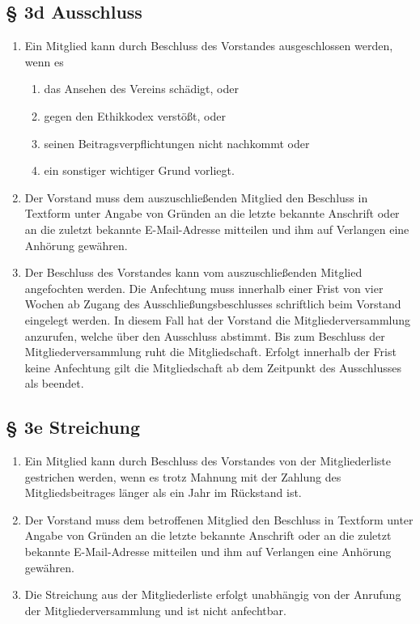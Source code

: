 \documentclass[11pt,a4paper]{scrartcl}
\begin{document}
\subsection*{§ 3d Ausschluss}
\begin{enumerate}[label=\arabic*.]
    \item Ein Mitglied kann durch Beschluss des Vorstandes ausgeschlossen werden, wenn es
    \begin{enumerate}[label=\roman*.]
        \item das Ansehen des Vereins schädigt, oder
        \item gegen den Ethikkodex verstößt, oder
        \item seinen Beitragsverpflichtungen nicht nachkommt oder
        \item ein sonstiger wichtiger Grund vorliegt.
    \end{enumerate}
    \item Der Vorstand muss dem auszuschließenden Mitglied den Beschluss in Textform unter Angabe von Gründen an die letzte bekannte Anschrift oder an die zuletzt bekannte E-Mail-Adresse mitteilen und ihm auf Verlangen eine Anhörung gewähren.
    \item Der Beschluss des Vorstandes kann vom auszuschließenden Mitglied angefochten werden. Die Anfechtung muss innerhalb einer Frist von vier Wochen ab Zugang des Ausschließungsbeschlusses schriftlich beim Vorstand eingelegt werden. In diesem Fall hat der Vorstand die Mitgliederversammlung anzurufen, welche über den Ausschluss abstimmt. Bis zum Beschluss der Mitgliederversammlung ruht die Mitgliedschaft. Erfolgt innerhalb der Frist keine Anfechtung gilt die Mitgliedschaft ab dem Zeitpunkt des Ausschlusses als beendet.
\end{enumerate}

\subsection*{§ 3e Streichung}
\begin{enumerate}[label=\arabic*.]
    \item Ein Mitglied kann durch Beschluss des Vorstandes von der Mitgliederliste gestrichen werden, wenn es trotz Mahnung mit der Zahlung des Mitgliedsbeitrages länger als ein Jahr im Rückstand ist.
    \item Der Vorstand muss dem betroffenen Mitglied den Beschluss in Textform unter Angabe von Gründen an die letzte bekannte Anschrift oder an die zuletzt bekannte E-Mail-Adresse mitteilen und ihm auf Verlangen eine Anhörung gewähren.
    \item Die Streichung aus der Mitgliederliste erfolgt unabhängig von der Anrufung der Mitgliederversammlung und ist nicht anfechtbar.
\end{enumerate}
\end{document}
